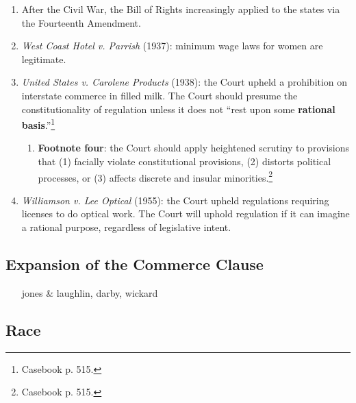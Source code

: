\begin{enumerate}
    \item After the Civil War, the Bill of Rights increasingly applied to the 
    states via the Fourteenth Amendment.
    \item \emph{West Coast Hotel v. Parrish} (1937): minimum wage laws for 
    women are legitimate. %
    \item \emph{United States v. Carolene Products} (1938): the Court upheld a 
    prohibition on interstate commerce in filled milk. The Court should 
    presume the constitutionality of regulation unless it does not ``rest upon 
    some \textbf{rational basis}.''\footnote{Casebook p. 515.} 
    \begin{enumerate}
        \item \textbf{Footnote four}: the Court should apply heightened 
        scrutiny to provisions that (1) facially violate constitutional 
        provisions, (2) distorts political processes, or (3) affects discrete 
        and insular minorities.\footnote{Casebook p. 515.}
    \end{enumerate}
    \item \emph{Williamson v. Lee Optical} (1955): the Court upheld 
    regulations requiring licenses to do optical work. The Court will uphold 
    regulation if it can imagine a rational purpose, regardless of legislative 
    intent.
\end{enumerate}

\subsection{Expansion of the Commerce Clause}

\begin{enumerate}
    \item [jones \& laughlin, darby, wickard] %
\end{enumerate}

\subsection{Race}

